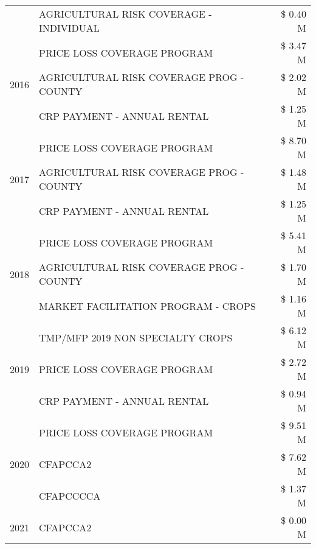 \begin{tabular}{llr}
 & AGRICULTURAL RISK COVERAGE - INDIVIDUAL & \$ 0.40 M \\
\cline{1-3}
\multirow[t]{3}{*}{2016} & PRICE LOSS COVERAGE PROGRAM & \$ 3.47 M \\
 & AGRICULTURAL RISK COVERAGE PROG - COUNTY & \$ 2.02 M \\
 & CRP PAYMENT - ANNUAL RENTAL & \$ 1.25 M \\
\cline{1-3}
\multirow[t]{3}{*}{2017} & PRICE LOSS COVERAGE PROGRAM & \$ 8.70 M \\
 & AGRICULTURAL RISK COVERAGE PROG - COUNTY & \$ 1.48 M \\
 & CRP PAYMENT - ANNUAL RENTAL & \$ 1.25 M \\
\cline{1-3}
\multirow[t]{3}{*}{2018} & PRICE LOSS COVERAGE PROGRAM & \$ 5.41 M \\
 & AGRICULTURAL RISK COVERAGE PROG - COUNTY & \$ 1.70 M \\
 & MARKET FACILITATION PROGRAM - CROPS & \$ 1.16 M \\
\cline{1-3}
\multirow[t]{3}{*}{2019} & TMP/MFP 2019 NON SPECIALTY CROPS & \$ 6.12 M \\
 & PRICE LOSS COVERAGE PROGRAM & \$ 2.72 M \\
 & CRP PAYMENT - ANNUAL RENTAL & \$ 0.94 M \\
\cline{1-3}
\multirow[t]{3}{*}{2020} & PRICE LOSS COVERAGE PROGRAM & \$ 9.51 M \\
 & CFAPCCA2 & \$ 7.62 M \\
 & CFAPCCCCA & \$ 1.37 M \\
\cline{1-3}
2021 & CFAPCCA2 & \$ 0.00 M \\
\cline{1-3}
\bottomrule
\end{tabular}
